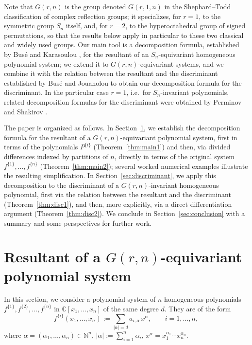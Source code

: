 \documentclass[12pt]{amsart}
\theoremstyle{definition}
\begin{document}
Note that $G(r,n)$ is the group denoted $G(r,1,n)$ in the Shephard--Todd classification of complex reflection groups; it specializes, for $r=1$, to the symmetric group $S_n$ itself, and, for $r=2$, to the hyperoctahedral group of signed permutations, so that the results below apply in particular to these two classical and widely used groups. Our main tool is a decomposition formula, established by Bus\'e and Karasoulou \citep{BuseKarasoulou2016}, for the resultant of an $S_n$-equivariant homogeneous polynomial system; we extend it to $G(r,n)$-equivariant systems, and we combine it with the relation between the resultant and the discriminant established by Bus\'e and Jouanolou \citep{BuseJouanolou2014} to obtain our decomposition formula for the discriminant. In the particular case $r=1$, i.e.\ for $S_n$-invariant polynomials, related decomposition formulas for the discriminant were obtained by Perminov and Shakirov \citep{PerminovShakirov2009}.

The paper is organized as follows. In Section~\ref{sec:resultant}, we establish the decomposition formula for the resultant of a $G(r,n)$-equivariant polynomial system, first in terms of the polynomials $P^{\{i\}}$ (Theorem~\ref{thm:main1}) and then, via divided differences indexed by partitions of $n$, directly in terms of the original system $f^{\{1\}}, \dots, f^{\{n\}}$ (Theorem~\ref{thm:main2}); several worked numerical examples illustrate the resulting simplification. In Section~\ref{sec:discriminant}, we apply this decomposition to the discriminant of a $G(r,n)$-invariant homogeneous polynomial, first via the relation between the resultant and the discriminant (Theorem~\ref{thm:disc1}), and then, more explicitly, via a direct differentiation argument (Theorem~\ref{thm:disc2}). We conclude in Section~\ref{sec:conclusion} with a summary and some perspectives for further work.

\section{Resultant of a $G(r,n)$-equivariant polynomial system}
\label{sec:resultant}

In this section, we consider a polynomial system of $n$ homogeneous polynomials $f^{\{1\}}, f^{\{2\}}, \dots, f^{\{n\}}$ in $\mathbb{C}[x_1,\dots,x_n]$ of the same degree $d$. They are of the form
\[
f^{\{i\}}(x_1,\dots,x_n) := \sum_{|\alpha|=d} a_{i,\alpha}\, x^{\alpha}, \qquad i = 1,\dots,n,
\]
where $\alpha = (\alpha_1,\dots,\alpha_n) \in \mathbb{N}^n$, $|\alpha| := \sum_{i=1}^n \alpha_i$, $x^\alpha = x_1^{\alpha_1}\cdots x_n^{\alpha_n}$.
\end{document}
